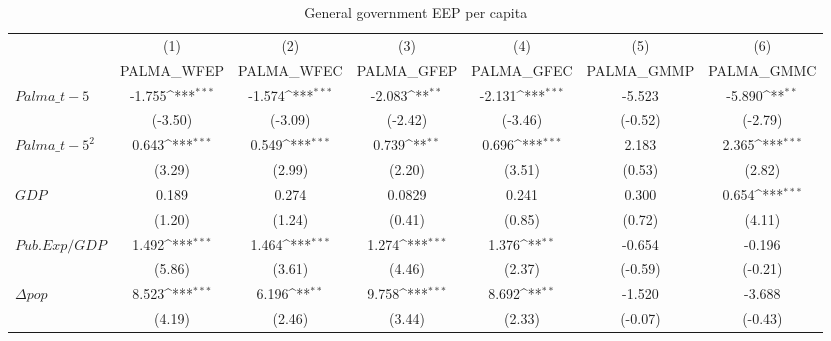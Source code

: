 \begin{table}[htbp]\centering
\def\sym#1{\ifmmode^{#1}\else\(^{#1}\)\fi}
\caption{General government EEP per capita}
\begin{tabular}{l*{6}{c}}
\hline\hline
                    &\multicolumn{1}{c}{(1)}         &\multicolumn{1}{c}{(2)}         &\multicolumn{1}{c}{(3)}         &\multicolumn{1}{c}{(4)}         &\multicolumn{1}{c}{(5)}         &\multicolumn{1}{c}{(6)}         \\
                    &  PALMA\_WFEP         &  PALMA\_WFEC         &  PALMA\_GFEP         &  PALMA\_GFEC         &  PALMA\_GMMP         &  PALMA\_GMMC         \\
\hline
$ Palma\_{t-5} $     &      -1.755\sym{***}&      -1.574\sym{***}&      -2.083\sym{**} &      -2.131\sym{***}&      -5.523         &      -5.890\sym{**} \\
                    &     (-3.50)         &     (-3.09)         &     (-2.42)         &     (-3.46)         &     (-0.52)         &     (-2.79)         \\
[1em]
$ Palma\_{t-5}^2 $   &       0.643\sym{***}&       0.549\sym{***}&       0.739\sym{**} &       0.696\sym{***}&       2.183         &       2.365\sym{***}\\
                    &      (3.29)         &      (2.99)         &      (2.20)         &      (3.51)         &      (0.53)         &      (2.82)         \\
[1em]
$ GDP $             &       0.189         &       0.274         &      0.0829         &       0.241         &       0.300         &       0.654\sym{***}\\
                    &      (1.20)         &      (1.24)         &      (0.41)         &      (0.85)         &      (0.72)         &      (4.11)         \\
[1em]
$ Pub.Exp/GDP $     &       1.492\sym{***}&       1.464\sym{***}&       1.274\sym{***}&       1.376\sym{**} &      -0.654         &      -0.196         \\
                    &      (5.86)         &      (3.61)         &      (4.46)         &      (2.37)         &     (-0.59)         &     (-0.21)         \\
[1em]
$ \Delta pop $      &       8.523\sym{***}&       6.196\sym{**} &       9.758\sym{***}&       8.692\sym{**} &      -1.520         &      -3.688         \\
                    &      (4.19)         &      (2.46)         &      (3.44)         &      (2.33)         &     (-0.07)         &     (-0.43)         \\

\end{tabular}
\end{table}
